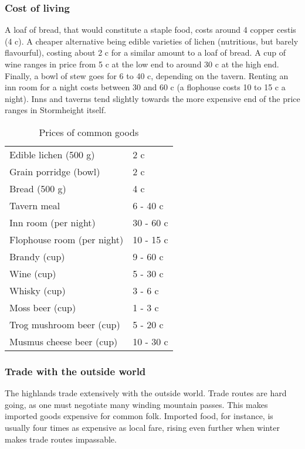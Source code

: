 \documentclass[a4paper,11pt,oneside]{book}
\begin{document}
\subsubsection{Cost of living}
A loaf of bread, that would constitute a staple food, costs around 4 copper cestis (4 c). A cheaper alternative being edible varieties of lichen (nutritious, but barely flavourful), costing about 2 c for a similar amount to a loaf of bread. A cup of wine ranges in price from 5 c at the low end to around 30 c at the high end. Finally, a bowl of stew goes for 6 to 40 c, depending on the tavern. Renting an inn room for a night costs between 30 and 60 c (a flophouse costs 10 to 15 c a night). Inns and taverns tend slightly towards the more expensive end of the price ranges in Stormheight itself.  

\begin{table}[ht!]
	\centering
	\begin{tabular}{|l|l|}
		\hline
		Edible lichen (500 g)  & 2 c\\
		Grain porridge (bowl) & 2 c \\ 
		Bread (500 g) & 4 c \\
		Tavern meal & 6 - 40 c \\
		Inn room (per night) & 30 - 60 c \\
		Flophouse room (per night) & 10 - 15 c \\
		Brandy (cup) & 9 - 60 c \\
		Wine (cup) & 5 - 30 c \\
		Whisky (cup) & 3 - 6 c \\
		Moss beer (cup) & 1 - 3 c\\
		Trog mushroom beer (cup) & 5 - 20 c \\
		Musmus cheese beer (cup) & 10 - 30 c\\
		\hline		
	\end{tabular}
\caption{Prices of common goods}
\end{table}

\subsubsection{Trade with the outside world}
The highlands trade extensively with the outside world. Trade routes are hard going, as one must negotiate many winding mountain passes. This makes imported goods expensive for common folk. Imported food, for instance, is usually four times as expensive as local fare, rising even further when winter makes trade routes impassable. 
\end{document}
